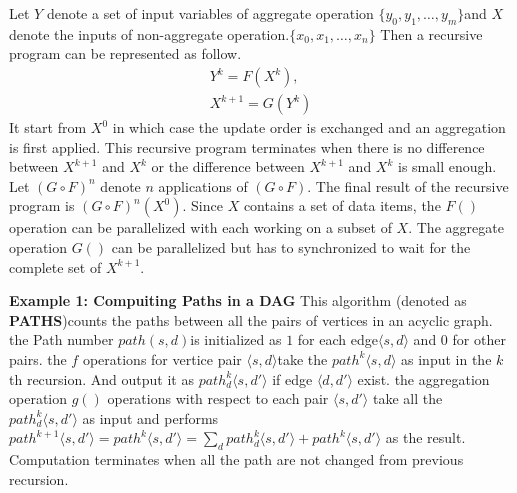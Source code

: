 Let $Y$ denote a set of input variables of aggregate operation $\{y_0,y_1,\dots,y_m\}$and $X$ denote the inputs of non-aggregate  operation.$\{x_0,x_1,\dots,x_n\}$%
Then a recursive program can be represented as follow.
\begin{equation}
\label{eq:recursive2}
\begin{aligned}
Y^{k}=F(X^k),\\
X^{k+1}=G(Y^k)
\end{aligned}
\end{equation}
It  start from $X^0$ in which case the update order is exchanged and an aggregation is first applied. This recursive program terminates when there is no difference between $X^{k+1}$ and $X^k$ or the difference between $X^{k+1}$ and $X^k$ is small enough. Let $(G\circ F)^n$ denote $n$ applications of $(G\circ F)$. The final result of the recursive program is $(G\circ F)^n(X^0)$. Since $X$ contains a set of data items, the $F()$ operation can be parallelized with each working on a subset of $X$. The aggregate operation $G()$ can be parallelized  but has to synchronized to wait for the complete set of $X^{k+1}$.

\textbf{Example 1: Compuiting Paths in a DAG} This algorithm (denoted as \textbf{PATHS})counts the paths between all the pairs of vertices in an acyclic graph. the Path number $path(s,d)$is initialized as $1$ for each edge$\langle s,d\rangle$ and $0$ for other pairs. the $f$ operations for vertice pair $\langle s,d\rangle$take the $path^k\langle s,d\rangle$ as input in the $k$th recursion. And output it as $path_{d}^k\langle s,d'\rangle$ if edge $\langle d,d'\rangle$ exist. the aggregation operation $g()$ operations with respect to each pair $\langle s,d'\rangle$ take all the $path_{d}^k\langle s,d'\rangle$ as input and performs $path^{k+1}\langle s,d'\rangle=path^k\langle s,d'\rangle=\sum_d path_{d}^k\langle s,d'\rangle+path^k\langle s,d'\rangle$ as the result. Computation terminates when all the path are not changed from previous recursion.

